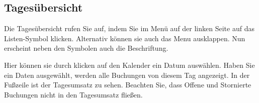 \subsection{Tagesübersicht}

Die Tagesübersicht rufen Sie auf, indem Sie im Menü auf der linken Seite auf das Listen-Symbol klicken. Alternativ können sie auch das Menu ausklappen. Nun erscheint neben den Symbolen auch die Beschriftung.

Hier können sie durch klicken auf den Kalender ein Datum auswählen. Haben Sie ein Daten ausgewählt, werden alle Buchungen von diesem Tag angezeigt. In der Fußzeile ist der Tagesumsatz zu sehen.
Beachten Sie, dass Offene und Stornierte Buchungen nicht in den Tagesumsatz fließen.